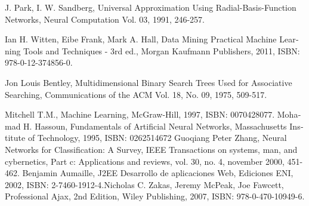 \begin{thebibliography}{Referencias}
J. Park, I. W. Sandberg, Universal Approximation Using Radial-Basis-Function
Networks, Neural Computation Vol.
03, 1991, 246-257.

\foreignlanguage{spanish}{Ian H. Witten, Eibe Frank, Mark A. Hall, Data Mining
Practical Machine Learning
Tools and Techniques - 3rd ed., Morgan Kaufmann Publishers, 2011, ISBN: 978-0-12-374856-0.}

Jon Louis Bentley, Multidimensional Binary Search Trees Used for Associative Searching, Communications of the ACM Vol. 18, No. 09, 1975, 509-517.

\foreignlanguage{spanish}{Mitchell T.M., Machine Learning, McGraw-Hill, 1997, ISBN: 0070428077.} \foreignlanguage{spanish}{Mohamad H. Hassoun, Fundamentals of Artificial Neural Networks, Massachusetts Institute of Technology, 1995, ISBN: 0262514672}
Guoqiang Peter Zhang, Neural Networks for Classification: A Survey, IEEE Transactions on systems, man, and cybernetics, Part c: Applications and reviews, vol. 30, no. 4, november 2000, 451-462.
Benjamin Aumaille, J2EE Desarrollo de aplicaciones Web, Ediciones ENI, 2002, ISBN: 2-7460-1912-4.Nicholas C. Zakas, Jeremy McPeak, Joe Fawcett, Professional Ajax, 2nd Edition, Wiley Publishing, 2007, ISBN: 978-0-470-10949-6.\end{thebibliography}
